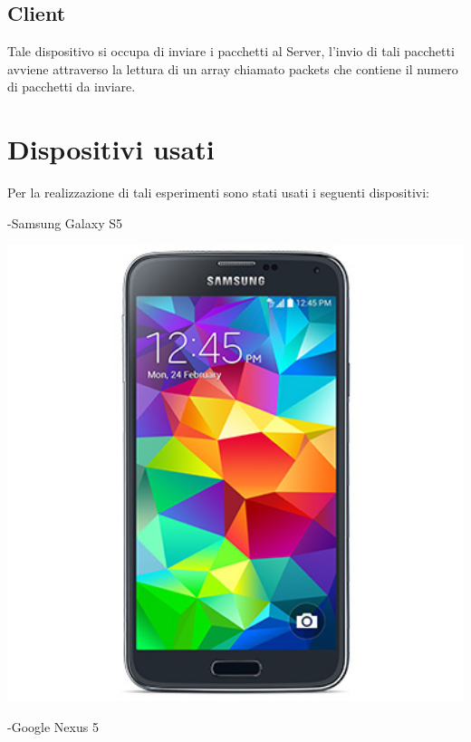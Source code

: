 \subsection{Client}
Tale dispositivo si occupa di inviare i pacchetti al Server, l'invio di tali pacchetti avviene attraverso la lettura di un array chiamato packets che contiene il numero di pacchetti da inviare.


\section{Dispositivi usati}
Per la realizzazione di tali esperimenti sono stati usati i seguenti dispositivi:

-Samsung Galaxy S5

\begin{center}
\includegraphics[width=1\textwidth]{imgs/s5.jpg}
\label{s5_img}%
\end{center}
\newpage

-Google Nexus 5

